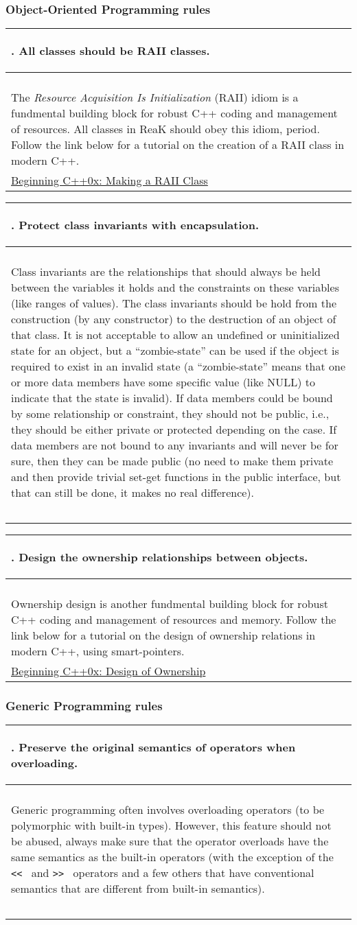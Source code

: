 \documentclass[10pt]{article}
\newcommand{\code}[1]{\color[rgb]{0.2,0.8,0.2}\texttt{#1}\color[rgb]{0,0,0} }
\newcounter {iCommandment}
\newcommand{\CorG}[5]
{
\begin{table}[H]
\begin{center}
\begin{tabular}{| p{12cm} |}
\hline
#1. #2 \\
\hline
\vspace{-0.1cm}
\parbox{12cm}{\code{#3}} \\
\vspace{-0.2cm}
#4 \\
#5 \\
\hline
\end{tabular}
\end{center}
\end{table}
}
\newcommand{\Commandment}[4]
{
\CorG{\textbf{\arabic{iCommandment}}\addtocounter{iCommandment}{1}}
{\textbf{#1}}{#2}{#3}{#4}
}
\begin{document}
\subsubsection{Object-Oriented Programming rules}

\Commandment
{All classes should be RAII classes.}
{\ }
{The \textit{Resource Acquisition Is Initialization} (RAII) idiom is a fundmental building block for robust 
C++ coding and management of resources. All classes in ReaK should obey this idiom, period. Follow the link 
below for a tutorial on the creation of a RAII class in modern C++.}
{\href{http://www.daniweb.com/software-development/cpp/tutorials/373787}{Beginning C++0x: Making a RAII Class}}

\Commandment
{Protect class invariants with encapsulation.}
{\ }
{Class invariants are the relationships that should always be held between the 
variables it holds and the constraints on these variables (like ranges of values).
The class invariants should be hold from the construction (by any constructor) to 
the destruction of an object of that class. It is not acceptable to allow an undefined 
or uninitialized state for an object, but a ``zombie-state'' can be used if the object 
is required to exist in an invalid state (a ``zombie-state'' means that one or more data 
members have some specific value (like NULL) to indicate that the state is invalid).
If data members could be bound by some relationship or constraint, they should not 
be public, i.e., they should be either private or protected depending on the case. 
If data members are not bound to any invariants and will never be for sure, then 
they can be made public (no need to make them private and then provide trivial set-get
functions in the public interface, but that can still be done, it makes no real difference).
}
{\ }

\Commandment
{Design the ownership relationships between objects.}
{\ }
{Ownership design is another fundmental building block for robust 
C++ coding and management of resources and memory. Follow the link below for a tutorial on the design of 
ownership relations in modern C++, using smart-pointers.}
{\href{http://www.daniweb.com/software-development/cpp/tutorials/378692}{Beginning C++0x: Design of Ownership}}

\subsubsection{Generic Programming rules}

\Commandment
{Preserve the original semantics of operators when overloading.}
{\ }
{Generic programming often involves overloading operators (to be polymorphic with built-in types). However, 
this feature should not be abused, always make sure that the operator overloads have the same semantics as the 
built-in operators (with the exception of the \code{<<}\ and \code{>>}\ operators and a few others that have conventional semantics 
that are different from built-in semantics).}
{\ }
\end{document}
